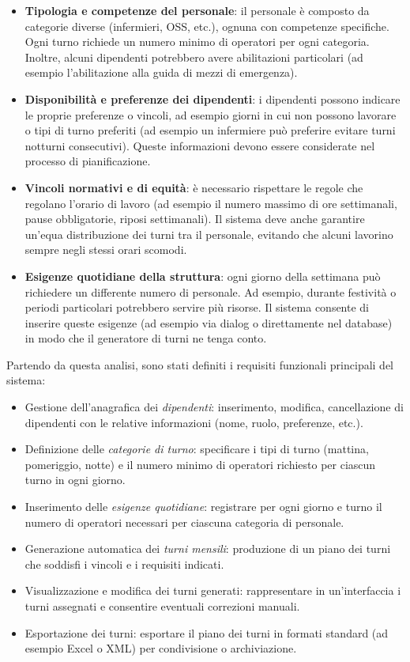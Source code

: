 \documentclass[a4paper,12pt]{report}
\begin{document}
\begin{itemize}
    \item \textbf{Tipologia e competenze del personale}: il personale \`e composto da categorie diverse (infermieri, OSS, etc.), ognuna con competenze specifiche. Ogni turno richiede un numero minimo di operatori per ogni categoria. Inoltre, alcuni dipendenti potrebbero avere abilitazioni particolari (ad esempio l'abilitazione alla guida di mezzi di emergenza).
    \item \textbf{Disponibilit\`a e preferenze dei dipendenti}: i dipendenti possono indicare le proprie preferenze o vincoli, ad esempio giorni in cui non possono lavorare o tipi di turno preferiti (ad esempio un infermiere pu\`o preferire evitare turni notturni consecutivi). Queste informazioni devono essere considerate nel processo di pianificazione.
    \item \textbf{Vincoli normativi e di equit\`a}: \`e necessario rispettare le regole che regolano l'orario di lavoro (ad esempio il numero massimo di ore settimanali, pause obbligatorie, riposi settimanali). Il sistema deve anche garantire un'equa distribuzione dei turni tra il personale, evitando che alcuni lavorino sempre negli stessi orari scomodi.
    \item \textbf{Esigenze quotidiane della struttura}: ogni giorno della settimana pu\`o richiedere un differente numero di personale. Ad esempio, durante festivit\`a o periodi particolari potrebbero servire pi\`u risorse. Il sistema consente di inserire queste esigenze (ad esempio via dialog o direttamente nel database) in modo che il generatore di turni ne tenga conto.
\end{itemize}

Partendo da questa analisi, sono stati definiti i requisiti funzionali principali del sistema:
\begin{itemize}
    \item Gestione dell'anagrafica dei \emph{dipendenti}: inserimento, modifica, cancellazione di dipendenti con le relative informazioni (nome, ruolo, preferenze, etc.).
    \item Definizione delle \emph{categorie di turno}: specificare i tipi di turno (mattina, pomeriggio, notte) e il numero minimo di operatori richiesto per ciascun turno in ogni giorno.
    \item Inserimento delle \emph{esigenze quotidiane}: registrare per ogni giorno e turno il numero di operatori necessari per ciascuna categoria di personale.
    \item Generazione automatica dei \emph{turni mensili}: produzione di un piano dei turni che soddisfi i vincoli e i requisiti indicati.
    \item Visualizzazione e modifica dei turni generati: rappresentare in un'interfaccia i turni assegnati e consentire eventuali correzioni manuali.
    \item Esportazione dei turni: esportare il piano dei turni in formati standard (ad esempio Excel o XML) per condivisione o archiviazione.
\end{itemize}
\end{document}
